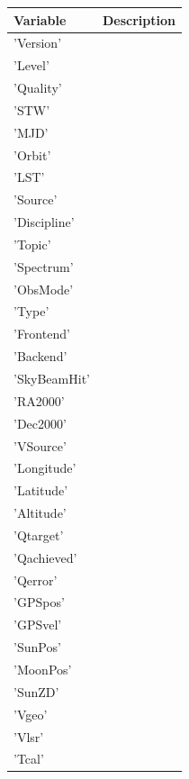 \begin{longtable}{| p{} | p{} |} 
\hline
  \textbf{Variable} & \textbf{Description} \\
  \hline
  'Version'         & \\ \hline
  'Level'           & \\ \hline
     'Quality'         & \\ \hline
     'STW'             & \\ \hline
     'MJD'             & \\ \hline
     'Orbit'           & \\ \hline
     'LST'             & \\ \hline
     'Source'          & \\ \hline
     'Discipline'      & \\ \hline
     'Topic'          & \\ \hline
     'Spectrum'        & \\    \hline
     'ObsMode'        & \\ \hline
     'Type'            & \\ \hline
     'Frontend'       & \\ \hline
     'Backend'       & \\ \hline
     'SkyBeamHit'      & \\ \hline
     'RA2000'        & \\ \hline
     'Dec2000'        & \\ \hline
     'VSource'         & \\ \hline
     'Longitude'    & \\ \hline
     'Latitude'        & \\ \hline
     'Altitude'        & \\ \hline
     'Qtarget'       & \\ \hline
     'Qachieved'      & \\ \hline
     'Qerror'         & \\ \hline
     'GPSpos'          & \\ \hline
     'GPSvel'         & \\ \hline
     'SunPos'          & \\ \hline
     'MoonPos'        & \\ \hline
     'SunZD'           & \\ \hline
     'Vgeo'           & \\ \hline
     'Vlsr'            & \\ \hline
     'Tcal'          & \\ \hline

\end{longtable}
